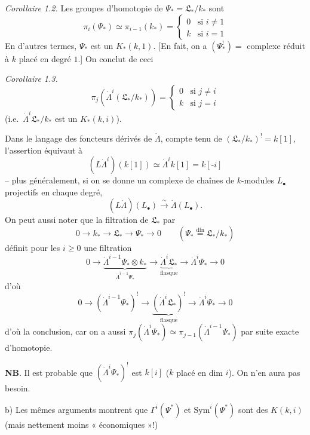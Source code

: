 \documentclass[11pt,a4paper]{article}
\begin{document}
\emph{Corollaire 1.2.} Les groupes d'homotopie de $\Psi_* =
\mathfrak{L}_*/k_*$ sont
\[ \pi_i(\Psi_*) \simeq \pi_{i-1}(k_*) = \begin{cases} 0 & \text{si } i \neq 1 \\ k & \text{si } i = 1 \end{cases} \]
En d'autres termes, $\Psi_*$ \struck{\ill{}} est un $K_*(k, 1)$.
[En fait, on a $(\Psi^!_*) =$ complexe réduit à $k$ placé en degré $1$.]
On conclut de ceci 

\emph{Corollaire 1.3.}
\[ \pi_j(\dot\Lambda^i(\mathfrak{L}_*/k_*)) = \begin{cases} 0 & \text{si } j \neq i \\ k & \text{si } j = i \end{cases} \]
(i.e.\ $\dot\Lambda^i\mathfrak{L}_*/k_*$ est un $K_*(k, i)$).

Dans le langage  des foncteurs
dérivés de $\dot\Lambda$, compte tenu de $(\mathfrak{L}_*/k_*)^! = k[1]$,
l'assertion équivaut à
\[ (L\dot\Lambda^i)(k[1]) \simeq \dot\Lambda^i k[1] = k[\text{-}i] \]
-- plus généralement, si on se donne un
complexe de chaînes de $k$-modules $L_\bullet$
projectifs en chaque degré,
\[ (L\dot\Lambda)(L_\bullet) \xrightarrow{\ \sim\ } \dot\Lambda(L_\bullet) . \]
On peut aussi noter que la filtration de $\mathfrak{L}_*$ par
\[ 0 \to k_* \to \mathfrak{L}_* \to \Psi_* \to 0 \qquad (\Psi_* \overset{\mathrm{dfn}}{=} \mathfrak{L}_*/k_*) \]
définit pour les $i \geq 0$ une filtration
\[ 0 \to \underbrace{\dot\Lambda^{i-1}\Psi_* \otimes k_*}_{\dot\Lambda^{i-1}\Psi_*} \to \underbrace{\dot\Lambda^i\mathfrak{L}_*}_{\text{flasque}} \to \dot\Lambda^i\Psi_* \to 0 \]
d'où
\[ 0 \to (\dot\Lambda^{i-1}\Psi_*)^! \to \underbrace{(\dot\Lambda^i\mathfrak{L}_*)^!}_{\text{flasque}} \to \dot\Lambda^i\Psi_* \to 0 \]
d'où la conclusion, car on a aussi $\pi_j(\dot\Lambda^i\Psi_*) \simeq \pi_{j-1}(\dot\Lambda^{i-1}\Psi_*)$
par suite exacte d'homotopie.

\textbf{NB}. Il est probable que $(\dot\Lambda^i\Psi_*)^!$ est \struck{\ill{}} $k[i]$
($k$ placé en dim $i$). On n'en aura pas besoin.

b) Les mêmes arguments montrent que
$\Gamma^i(\Psi^*)$ et \struck{\ill{}} $\mathrm{Sym}^i(\Psi^*)$ sont des $K(k, i)$
\add{$\otimes \Psi^*$} (mais nettement moins « économiques »!)
\end{document}
